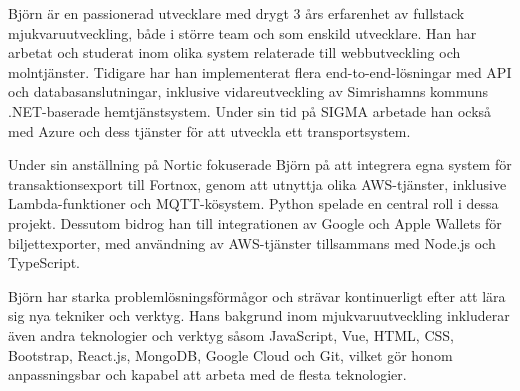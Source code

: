 Björn är en passionerad utvecklare med drygt 3 års erfarenhet av fullstack mjukvaruutveckling, både i större team och som enskild utvecklare. Han har arbetat och studerat inom olika system relaterade till webbutveckling och molntjänster. Tidigare har han implementerat flera end-to-end-lösningar med API
och databasanslutningar, inklusive vidareutveckling av Simrishamns kommuns .NET-baserade hemtjänstsystem. Under sin tid på SIGMA arbetade han också med Azure och dess tjänster för att utveckla ett transportsystem.

Under sin anställning på Nortic fokuserade Björn på att integrera egna system för transaktionsexport till Fortnox, genom att utnyttja olika AWS-tjänster, inklusive Lambda-funktioner och MQTT-kösystem. Python spelade en central roll i dessa projekt. Dessutom bidrog han till integrationen av Google och Apple Wallets för biljettexporter, med användning av AWS-tjänster tillsammans med Node.js och TypeScript.

Björn har starka problemlösningsförmågor och strävar kontinuerligt efter att lära sig nya tekniker och verktyg. Hans bakgrund inom mjukvaruutveckling inkluderar även andra teknologier och verktyg såsom JavaScript, Vue, HTML, CSS, Bootstrap, React.js, MongoDB, Google Cloud och Git, vilket gör honom anpassningsbar och kapabel att arbeta med de flesta teknologier.